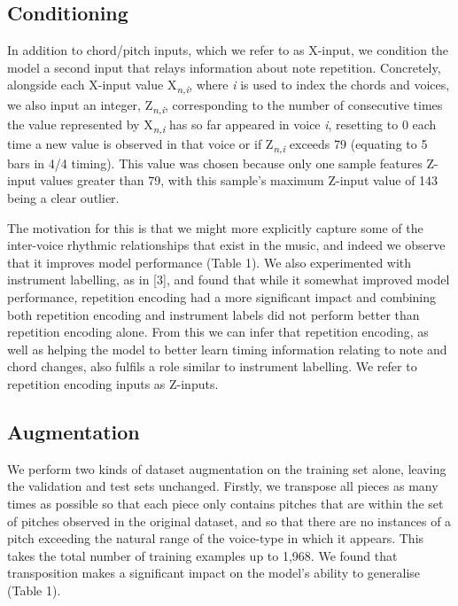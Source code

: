 \documentclass{article}
\begin{document}
\subsection{Conditioning}\label{subsec:conditioning}

In addition to chord/pitch inputs, which we refer to as X-input, we condition the model a second input that relays information about note repetition. Concretely, alongside each X-input value X\textsubscript{\textit{n,i}}, where \textit{i} is used to index the chords and voices, we also input an integer, Z\textsubscript{\textit{n,i}}, corresponding to the number of consecutive times the value represented by X\textsubscript{\textit{n,i}} has so far appeared in voice \textit{i}, resetting to 0 each time a new value is observed in that voice or if Z\textsubscript{\textit{n,i}} exceeds 79 (equating to 5 bars in 4/4 timing). This value was chosen because only one sample features Z-input values greater than 79, with this sample's maximum Z-input value of 143 being a clear outlier.

The motivation for this is that we might more explicitly capture some of the inter-voice rhythmic relationships that exist in the music, and indeed we observe that it improves model performance (Table 1). We also experimented with instrument labelling, as in [3], and found that while it somewhat improved model performance, repetition encoding had a more significant impact and combining both repetition encoding and instrument labels did not perform better than repetition encoding alone. From this we can infer that repetition encoding, as well as helping the model to better learn timing information relating to note and chord changes, also fulfils a role similar to instrument labelling. We refer to repetition encoding inputs as Z-inputs.

\subsection{Augmentation}\label{subsec:aug}

We perform two kinds of dataset augmentation on the training set alone, leaving the validation and test sets unchanged. Firstly, we transpose all pieces as many times as possible so that each piece only contains pitches that are within the set of pitches observed in the original dataset, and so that there are no instances of a pitch exceeding the natural range of the voice-type in which it appears. This takes the total number of training examples up to 1,968. We found that transposition makes a significant impact on the model's ability to generalise (Table 1).
\end{document}
